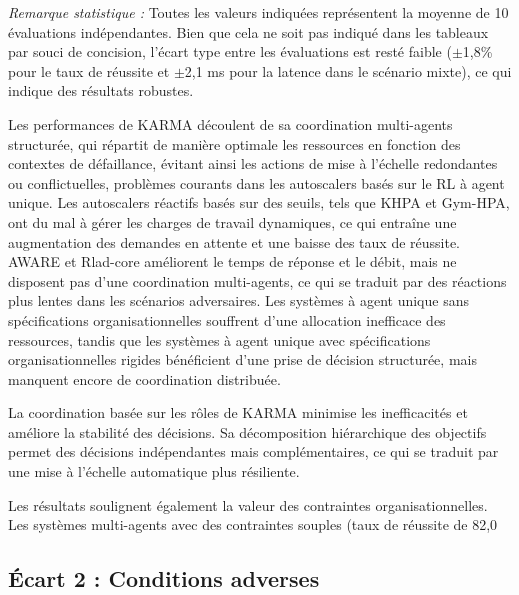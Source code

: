 \noindent \textit{Remarque statistique :} Toutes les valeurs indiquées représentent la moyenne de 10 évaluations indépendantes. Bien que cela ne soit pas indiqué dans les tableaux par souci de concision, l'écart type entre les évaluations est resté faible ($\pm$1,8\% pour le taux de réussite et $\pm$2,1 ms pour la latence dans le scénario mixte), ce qui indique des résultats robustes.

Les performances de KARMA découlent de sa coordination multi-agents structurée, qui répartit de manière optimale les ressources en fonction des contextes de défaillance, évitant ainsi les actions de mise à l'échelle redondantes ou conflictuelles, problèmes courants dans les autoscalers basés sur le RL à agent unique.
%
Les autoscalers réactifs basés sur des seuils, tels que KHPA et Gym-HPA, ont du mal à gérer les charges de travail dynamiques, ce qui entraîne une augmentation des demandes en attente et une baisse des taux de réussite. AWARE et Rlad-core améliorent le temps de réponse et le débit, mais ne disposent pas d'une coordination multi-agents, ce qui se traduit par des réactions plus lentes dans les scénarios adversaires. Les systèmes à agent unique sans spécifications organisationnelles souffrent d'une allocation inefficace des ressources, tandis que les systèmes à agent unique avec spécifications organisationnelles rigides bénéficient d'une prise de décision structurée, mais manquent encore de coordination distribuée.

La coordination basée sur les rôles de KARMA minimise les inefficacités et améliore la stabilité des décisions. Sa décomposition hiérarchique des objectifs permet des décisions indépendantes mais complémentaires, ce qui se traduit par une mise à l'échelle automatique plus résiliente.

Les résultats soulignent également la valeur des contraintes organisationnelles. Les systèmes multi-agents avec des contraintes souples (taux de réussite de 82,0 %



\subsection{Écart 2 : Conditions adverses}

